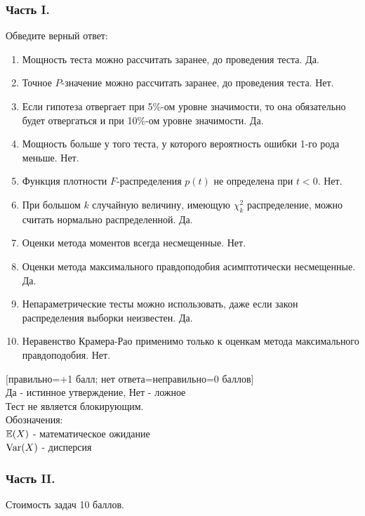 \documentclass[12pt, a4paper]{article}\usepackage[]{graphicx}\usepackage[]{color}
\begin{document}
\subsubsection*{Часть I.}

Обведите верный ответ:

\begin{enumerate}
\item Мощность теста можно рассчитать заранее, до проведения теста. Да.
\item Точное $P$-значение можно рассчитать заранее, до проведения теста. Нет.
\item Если гипотеза отвергает при 5\%-ом уровне значимости, то
она обязательно будет отвергаться и при 10\%-ом уровне значимости. Да.
\item Мощность больше у того теста, у которого вероятность ошибки
1-го рода меньше.  Нет.
\item Функция плотности $F$-распределения $p(t)$ не определена при $t<0$.  Нет.
\item При большом $k$ случайную величину, имеющую $\chi_{k}^{2}$ распределение, можно считать нормально распределенной. Да.
\item Оценки метода моментов всегда несмещенные.  Нет.
\item Оценки метода максимального правдоподобия асимптотически несмещенные. Да.
\item Непараметрические тесты можно использовать, даже если закон распределения выборки неизвестен. Да.
\item Неравенство Крамера-Рао применимо только к оценкам метода максимального правдоподобия. Нет.
\end{enumerate}

$[$правильно=+1 балл; нет ответа=неправильно=0 баллов$]$ \\
Да - истинное утверждение, Нет - ложное \\
Тест не является блокирующим. \\
Обозначения: \\
$\mathbb{E}(X)$ - математическое ожидание \\
$\operatorname{Var}(X)$ - дисперсия

\subsubsection*{Часть II.}

Стоимость задач 10 баллов.
\end{document}
